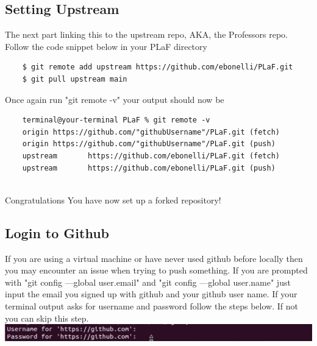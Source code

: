\documentclass{article}
\begin{document}



\subsection{Setting Upstream}
The next part linking this to the upstream repo, AKA, the Professors repo. Follow the code snippet below in your PLaF directory

\begin{verbatim}
    $ git remote add upstream https://github.com/ebonelli/PLaF.git
    $ git pull upstream main
\end{verbatim}
  
Once again run "git remote -v" your output should now be 
\begin{verbatim}
    terminal@your-terminal PLaF % git remote -v
    origin https://github.com/"githubUsername"/PLaF.git (fetch)
    origin https://github.com/"githubUsername"/PLaF.git (push)
    upstream       https://github.com/ebonelli/PLaF.git (fetch)
    upstream       https://github.com/ebonelli/PLaF.git (push)
    
\end{verbatim}

Congratulations You have now set up a forked repository!

\subsection{Login to Github}
If you are using a virtual machine or have never used github before locally then you may encounter an issue when trying to push something. If you are prompted with "git config —global user.email" and "git config —global user.name" just input the email you signed up with github and your github user name. If your terminal output asks for username and password follow the steps below. If not you can skip this step. \\

\includegraphics[width=1\textwidth]{images/errorLogin.png} \\ 
\end{document}
